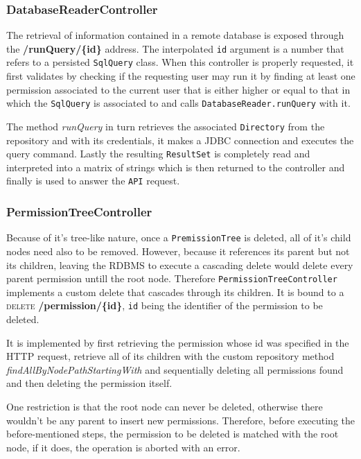 

\subsubsection{DatabaseReaderController}
The retrieval of information contained in a remote database is exposed through the \textbf{/runQuery/\{id\}} address. The interpolated \texttt{id} argument is a number that refers to a persisted \texttt{SqlQuery} class. When this controller is properly requested, it first validates by checking if the requesting user may run it by finding at least one permission associated to the current user that is either higher or equal to that in which the \texttt{SqlQuery} is associated to and calls \texttt{DatabaseReader.runQuery} with it.

The method \textit{runQuery} in turn retrieves the associated \texttt{Directory} from the repository and with its credentials, it makes a \gls{JDBC} connection and executes the query command. Lastly the resulting \texttt{ResultSet} is completely read and interpreted into a matrix of strings which is then returned to the controller and finally is used to answer the \texttt{API} request.

\subsubsection{PermissionTreeController}
Because of it's tree-like nature, once a \texttt{PremissionTree} is deleted, all of it's child nodes need also to be removed. However, because it references its parent but not its children, leaving the \gls{RDBMS} to execute a cascading delete would delete every parent permission untill the root node.
Therefore \texttt{PermissionTreeController} implements a custom delete that cascades through its children. It is bound to a \textsc{delete} \textbf{/permission/\{id\}}, \texttt{id} being the identifier of the permission to be deleted.

It is implemented by first retrieving the permission whose id was specified in the \gls{HTTP} request, retrieve all of its children with the custom repository method \textit{findAllByNodePathStartingWith} and sequentially deleting all permissions found and then deleting the permission itself.

One restriction is that the root node can never be deleted, otherwise there wouldn't be any parent to insert new permissions. Therefore, before executing the before-mentioned steps, the permission to be deleted is matched with the root node, if it does, the operation is aborted with an error.

